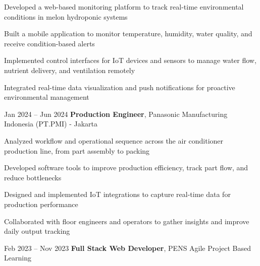 \vspace{0.10 cm}
\begin{onecolentry}
	\begin{highlights}
		\item Developed a web-based monitoring platform to track real-time environmental conditions in melon hydroponic systems
		\item Built a mobile application to monitor temperature, humidity, water quality, and receive condition-based alerts
		\item Implemented control interfaces for IoT devices and sensors to manage water flow, nutrient delivery, and ventilation remotely
		\item Integrated real-time data visualization and push notifications for proactive environmental management
	\end{highlights}
\end{onecolentry}

\vspace{0.5 cm}

\begin{twocolentrydate}{Jan 2024 -- Jun 2024}
	\textbf{Production Engineer}, Panasonic Manufacturing Indonesia (PT.PMI) - Jakarta
\end{twocolentrydate}

\vspace{0.10 cm}
\begin{onecolentry}
	\begin{highlights}
		\item Analyzed workflow and operational sequence across the air conditioner production line, from part assembly to packing
		\item Developed software tools to improve production efficiency, track part flow, and reduce bottlenecks
		\item Designed and implemented IoT integrations to capture real-time data for production performance
		\item Collaborated with floor engineers and operators to gather insights and improve daily output tracking
	\end{highlights}
\end{onecolentry}

\vspace{0.5 cm}

\begin{twocolentrydate}{Feb 2023 -- Nov 2023}
	\textbf{Full Stack Web Developer}, PENS Agile Project Based Learning
\end{twocolentrydate}

